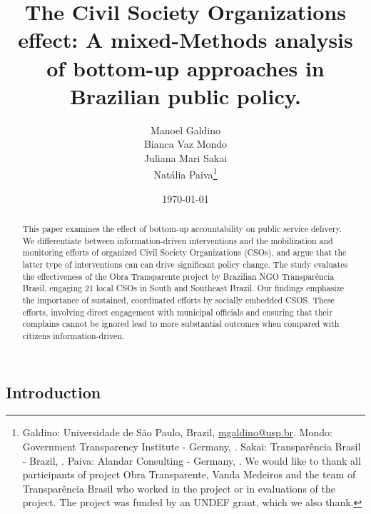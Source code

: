 \documentclass[]{AEA}
\begin{document}
\title{The Civil Society Organizations effect: A mixed-Methods analysis
of bottom-up approaches in Brazilian public policy.}


\author{
  Manoel Galdino\\
  Bianca Vaz Mondo\\
  Juliana Mari Sakai\\
  Natália Paiva\thanks{
  Galdino: Universidade de São Paulo,
Brazil, \href{mailto:mgaldino@usp.br}{mgaldino@usp.br}.
  Mondo: Government Transparency Institute - Germany, \href{mailto:}{}.
  Sakai: Transparência Brasil - Brazil, \href{mailto:}{}.
  Paiva: Alandar Consulting - Germany, \href{mailto:}{}.
  We would like to thank all participants of project Obra Transparente,
  Vanda Medeiros and the team of Transparência Brasil who worked in the
  project or in evaluations of the project. The project was funded by an
  UNDEF grant, which we also thank.
}
}

\date{\today}
\pubVolume{}
\pubIssue{}
\JEL{}

\begin{abstract}
This paper examines the effect of bottom-up accountability on public
service delivery. We differentiate between information-driven
interventions and the mobilization and monitoring efforts of organized
Civil Society Organizations (CSOs), and argue that the latter type of
interventions can can drive significant policy change. The study
evaluates the effectiveness of the Obra Transparente project by
Brazilian NGO Transparência Brasil, engaging 21 local CSOs in South and
Southeast Brazil. Our findings emphasize the importance of sustained,
coordinated efforts by socially embedded CSOS. These efforts, involving
direct engagement with municipal officials and ensuring that their
complains cannot be ignored lead to more substantial outcomes when
compared with citizens information-driven.
\end{abstract}


\maketitle

\hypertarget{introduction}{%
\subsection{Introduction}\label{introduction}}
\end{document}
